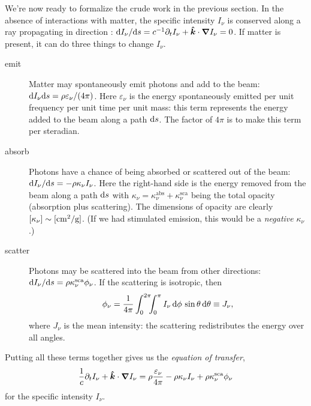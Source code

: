 We're now ready to formalize the crude work in the previous section.
In the absence of interactions with matter, the specific intensity $I_{\nu}$ is conserved along a ray propagating in direction \unitk: $\mathrm{d} I_{\nu}/\mathrm{d} s = c^{-1}\partial_{t}I_{\nu} + \boldsymbol{\hat{k}}\cdot\boldsymbol{\nabla} I_{\nu} = 0$. If matter is present, it can do three things to change $I_{\nu}$.
\begin{description}
\item[emit] Matter may spontaneously emit photons and add to the beam: $\mathrm{d} I_{\nu}\mathrm{d} s = \rho\varepsilon_{\nu}/(4\pi)$. Here $\varepsilon_{\nu}$ is the energy spontaneously emitted per unit frequency per unit time per unit mass: this term represents the energy added to the beam along a path $\mathrm{d} s$.  The factor of $4\pi$ is to make this term per steradian.

\item[absorb] Photons have a chance of being absorbed or scattered out of the beam: $\mathrm{d} I_{\nu}/\mathrm{d} s = -\rho\kappa_{\nu}I_{\nu}$. Here the right-hand side is the energy removed from the beam along a path $\mathrm{d} s$ with $\kappa_{\nu} = \kappa_{\nu}^{\mathrm{abs}} + \kappa_{\nu}^{\mathrm{sca}}$ being the total opacity (absorption plus scattering). The dimensions of opacity are clearly $[\kappa_{\nu}] \sim [\mathrm{c}\mathrm{m}^{2}/\mathrm{g}]$. (If we had stimulated emission, this would be a \emph{negative} $\kappa_{\nu}$.)

\item[scatter] Photons may be scattered into the beam from other directions: $\mathrm{d} I_{\nu}/\mathrm{d} s = \rho\kappa_{\nu}^{\mathrm{sca}}\phi_{\nu}$. If the scattering is isotropic, then
\begin{equation}\label{e.isosca}
\phi_{\nu} = \frac{1}{4\pi}\int_{0}^{2\pi}\!\!\!\int_{0}^{\pi} I_{\nu}\,\mathrm{d}\phi\,\sin\theta\,\mathrm{d}\theta \equiv J_{\nu},
\end{equation}
where $J_{\nu}$ is the mean intensity: the scattering redistributes the energy over all angles.
\end{description}
Putting all these terms together gives us the \emph{equation of transfer},
\begin{equation}\label{e.transfer}
\frac{1}{c}\partial_{t}I_{\nu} + \boldsymbol{\hat{k}}\cdot\boldsymbol{\nabla} I_{\nu} = \rho \frac{\varepsilon_{\nu}}{4\pi} - \rho\kappa_{\nu} I_{\nu} + \rho\kappa_{\nu}^{\mathrm{sca}}\phi_{\nu}
\end{equation}
for the specific intensity $I_{\nu}$.

